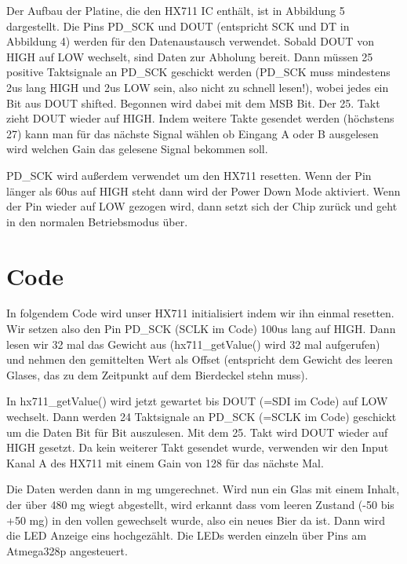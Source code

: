 \documentclass[12pt,journal,compsoc]{IEEEtran}
\begin{document}


Der Aufbau der Platine, die den  HX711 IC enthält, ist in Abbildung 5 dargestellt.
Die Pins PD\_SCK und DOUT (entspricht SCK und DT in Abbildung 4) werden für den Datenaustausch
verwendet. Sobald DOUT von HIGH auf LOW wechselt, sind Daten zur Abholung bereit.
Dann müssen 25 positive Taktsignale an PD\_SCK geschickt werden (PD\_SCK muss mindestens 2us lang
HIGH und 2us LOW sein, also nicht zu schnell lesen!), wobei jedes ein Bit aus DOUT shifted.
Begonnen wird dabei mit dem MSB Bit. Der 25. Takt zieht DOUT wieder auf HIGH.
Indem weitere Takte gesendet werden (höchstens 27) kann man für das nächste Signal wählen
ob Eingang A oder B ausgelesen wird welchen Gain das gelesene Signal bekommen soll. 

PD\_SCK wird außerdem verwendet um den HX711 resetten. Wenn der Pin länger als 60us auf HIGH
steht dann wird der Power Down Mode aktiviert. Wenn der Pin wieder auf LOW gezogen wird,
dann setzt sich der Chip zurück und geht in den normalen Betriebsmodus über.


\section{Code}

In folgendem Code wird unser HX711 initialisiert indem wir ihn einmal resetten.
Wir setzen also den Pin PD\_SCK (SCLK im Code) 100us lang auf HIGH. Dann lesen wir 32 mal das
Gewicht aus (hx711\_getValue() wird 32 mal aufgerufen) und nehmen den gemittelten Wert als
Offset (entspricht dem Gewicht des leeren Glases,
das zu dem Zeitpunkt auf dem Bierdeckel stehn muss).



In hx711\_getValue() wird jetzt gewartet bis DOUT (=SDI im Code) auf LOW wechselt.
Dann werden 24 Taktsignale an PD\_SCK (=SCLK im Code) geschickt um die Daten Bit für Bit auszulesen.
Mit dem 25. Takt wird DOUT wieder auf HIGH gesetzt. Da kein weiterer Takt gesendet wurde,
verwenden wir den Input Kanal A des HX711 mit einem Gain von 128 für das nächste Mal.



Die Daten werden dann in mg umgerechnet. Wird nun ein Glas mit einem Inhalt, der über 480 mg wiegt abgestellt, wird erkannt dass vom leeren Zustand (-50 bis +50 mg) in den vollen gewechselt wurde, also ein neues Bier da ist. Dann wird die LED Anzeige eins hochgezählt. Die LEDs werden einzeln über Pins am Atmega328p angesteuert.
\end{document}
